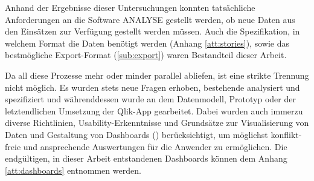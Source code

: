 Anhand der Ergebnisse dieser Untersuchungen konnten tatsächliche Anforderungen an die Software \gls{ANALYSE} gestellt werden, ob neue Daten aus den Einsätzen zur Verfügung gestellt werden müssen.
Auch die Spezifikation, in welchem Format die Daten benötigt werden (Anhang \ref{att:stories}), sowie das bestmögliche Export-Format (\ref{sub:export}) waren Bestandteil dieser Arbeit. 

Da all diese Prozesse mehr oder minder parallel abliefen, ist eine strikte Trennung nicht möglich.
Es wurden stets neue Fragen erhoben, bestehende analysiert und spezifiziert und währenddessen wurde an dem Datenmodell, Prototyp oder der letztendlichen Umsetzung der Qlik-App gearbeitet.
Dabei wurden auch immerzu diverse Richtlinien, Usability-Erkenntnisse und Grundsätze zur Visualisierung von Daten und Gestaltung von Dashboards (\cite{Bassler.2010, Card.2007, Fischer.2014, FischerStabel.2018, Hichert.2017, Kertzel.2018, Mccormick.1987, Schumann.2000, Ware.2009}) berücksichtigt, um möglichst konflikt-freie und ansprechende Auswertungen für die Anwender zu ermöglichen.
Die endgültigen, in dieser Arbeit entstandenen Dashboards können dem Anhang \ref{att:dashboards} entnommen werden.



